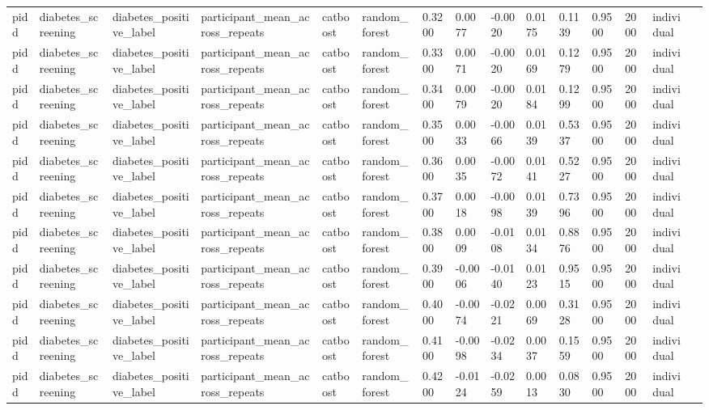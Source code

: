 \begin{tabular}{lllllllllllllll}
pidd & diabetes\_screening & diabetes\_positive\_label & participant\_mean\_across\_repeats & catboost & random\_forest & 0.3200 & 0.0077 & -0.0020 & 0.0175 & 0.1139 & 0.9500 & 2000 & individual &  \\
pidd & diabetes\_screening & diabetes\_positive\_label & participant\_mean\_across\_repeats & catboost & random\_forest & 0.3300 & 0.0071 & -0.0020 & 0.0169 & 0.1279 & 0.9500 & 2000 & individual &  \\
pidd & diabetes\_screening & diabetes\_positive\_label & participant\_mean\_across\_repeats & catboost & random\_forest & 0.3400 & 0.0079 & -0.0020 & 0.0184 & 0.1299 & 0.9500 & 2000 & individual &  \\
pidd & diabetes\_screening & diabetes\_positive\_label & participant\_mean\_across\_repeats & catboost & random\_forest & 0.3500 & 0.0033 & -0.0066 & 0.0139 & 0.5337 & 0.9500 & 2000 & individual &  \\
pidd & diabetes\_screening & diabetes\_positive\_label & participant\_mean\_across\_repeats & catboost & random\_forest & 0.3600 & 0.0035 & -0.0072 & 0.0141 & 0.5227 & 0.9500 & 2000 & individual &  \\
pidd & diabetes\_screening & diabetes\_positive\_label & participant\_mean\_across\_repeats & catboost & random\_forest & 0.3700 & 0.0018 & -0.0098 & 0.0139 & 0.7396 & 0.9500 & 2000 & individual &  \\
pidd & diabetes\_screening & diabetes\_positive\_label & participant\_mean\_across\_repeats & catboost & random\_forest & 0.3800 & 0.0009 & -0.0108 & 0.0134 & 0.8876 & 0.9500 & 2000 & individual &  \\
pidd & diabetes\_screening & diabetes\_positive\_label & participant\_mean\_across\_repeats & catboost & random\_forest & 0.3900 & -0.0006 & -0.0140 & 0.0123 & 0.9515 & 0.9500 & 2000 & individual &  \\
pidd & diabetes\_screening & diabetes\_positive\_label & participant\_mean\_across\_repeats & catboost & random\_forest & 0.4000 & -0.0074 & -0.0221 & 0.0069 & 0.3128 & 0.9500 & 2000 & individual &  \\
pidd & diabetes\_screening & diabetes\_positive\_label & participant\_mean\_across\_repeats & catboost & random\_forest & 0.4100 & -0.0098 & -0.0234 & 0.0037 & 0.1559 & 0.9500 & 2000 & individual &  \\
pidd & diabetes\_screening & diabetes\_positive\_label & participant\_mean\_across\_repeats & catboost & random\_forest & 0.4200 & -0.0124 & -0.0259 & 0.0013 & 0.0830 & 0.9500 & 2000 & individual &  \\

\end{tabular}
